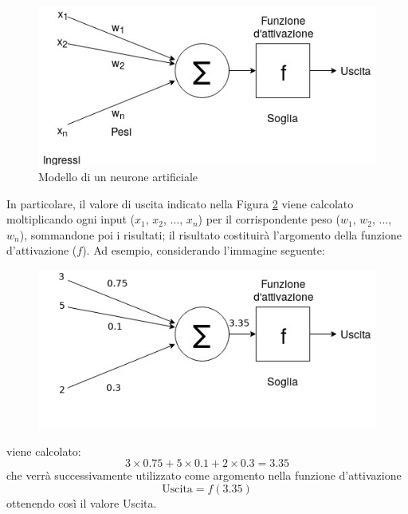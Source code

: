 \documentclass[12pt]{report}
\begin{document}
\begin{figure}[H]
\begin{center}
\includegraphics[scale=0.75]{neurone_artificiale.png}
\caption{Modello di un neurone artificiale}
\label{neuronImage}
\end{center}
\end{figure}

In particolare, il valore di uscita indicato nella Figura \ref{neuronImage} viene calcolato moltiplicando ogni input ($x_1$, $x_2$, $\dots$, $x_n$) per il corrispondente peso ($w_1$, $w_2$, $\dots$, $w_n$), sommandone poi i risultati; il risultato costituirà l'argomento della funzione d'attivazione ($f$). Ad esempio, considerando l'immagine seguente:
\null\par\null

\begin{figure}[H]
\begin{center}
\includegraphics[scale=0.75]{neurone_artificiale_esempio_pratico.png}
\label{neuronImage}
\end{center}
\end{figure}

viene calcolato: $$3 \times 0.75 + 5 \times 0.1 + 2 \times 0.3 = 3.35$$ che verrà successivamente utilizzato come argomento nella funzione d'attivazione
$$\mathrm{Uscita} = f(\mathrm{3.35})$$
ottenendo così il valore Uscita.
\newpage
\end{document}
